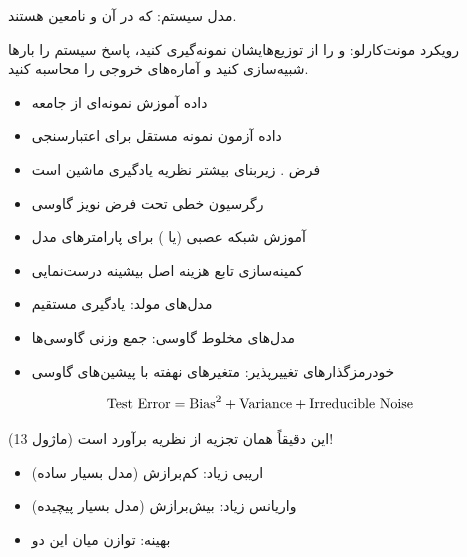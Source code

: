 
مدل سیستم:  که در آن  و \lr{\ensuremath{\tau}} نامعین هستند.

رویکرد مونت‌کارلو:  و \lr{\ensuremath{\tau}} را از توزیع‌هایشان نمونه‌گیری کنید، پاسخ سیستم را بارها شبیه‌سازی کنید و آماره‌های خروجی را محاسبه کنید.



\begin{itemize}
\tightlist
\item
  داده آموزش \lr{=} نمونه‌ای از جامعه
\item
  داده آزمون \lr{=} نمونه مستقل برای اعتبارسنجی
\item
  فرض . زیربنای بیشتر نظریه یادگیری ماشین است
\end{itemize}


\begin{itemize}
\tightlist
\item
  رگرسیون خطی  تحت فرض نویز گاوسی
\item
  آموزش شبکه عصبی  (یا ) برای پارامترهای مدل
\item
  کمینه‌سازی تابع هزینه \lr{=} اصل بیشینه درست‌نمایی
\end{itemize}


\begin{itemize}
\tightlist
\item
  مدل‌های مولد: یادگیری مستقیم 
\item
  مدل‌های مخلوط گاوسی: جمع وزنی گاوسی‌ها
\item
  خودرمزگذارهای تغییرپذیر: متغیرهای نهفته با پیشین‌های گاوسی
\end{itemize}


\[\text{Test Error} = \text{Bias}^2 + \text{Variance} + \text{Irreducible Noise}\]

این دقیقاً همان تجزیه  از نظریه برآورد است (ماژول 13)!

\begin{itemize}
\tightlist
\item
  اریبی زیاد: کم‌برازش (مدل بسیار ساده)
\item
  واریانس زیاد: بیش‌برازش (مدل بسیار پیچیده)
\item
  بهینه: توازن میان این دو
\end{itemize}

